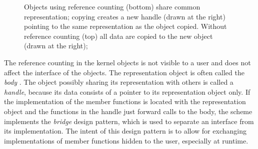 \begin{figure}
\caption{Objects using reference counting (bottom) share common representation;
copying creates a new handle (drawn at the right) pointing to the same 
representation as the object copied. Without reference counting (top) 
all data are copied to the new object (drawn at the right);\label{fig:refcounted}} 
\end{figure}


The reference counting in the kernel objects is not visible to a user
and does not affect the interface of the objects. 
The representation object is often called
the {\em body}%
.
The object possibly sharing its representation with others
is called a {\em handle},
because its data consists of a pointer
to its representation object only. If the implementation of the member 
functions is located with the representation object and the functions in the 
handle just forward calls to the body, the scheme implements the {\em bridge}
design pattern,
which is used to separate an interface from its implementation.
The intent of this design pattern is to allow for exchanging implementations
of member functions hidden to the user, especially at runtime. 

